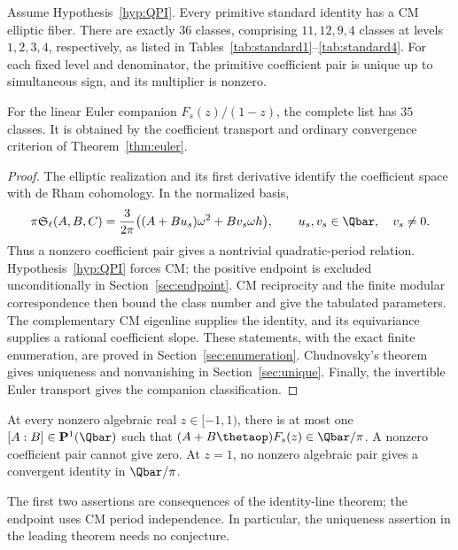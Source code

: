 \begin{theorem}\label{thm:main-conditional}
Assume Hypothesis~\ref{hyp:QPI}. Every primitive standard identity has
a CM elliptic fiber. There are exactly $36$ classes, comprising
$11,12,9,4$ classes at levels $1,2,3,4$, respectively, as listed in
Tables~\ref{tab:standard1}--\ref{tab:standard4}.
For each fixed level and denominator, the primitive coefficient pair
is unique up to simultaneous sign, and its multiplier is nonzero.

For the linear Euler companion $F_s(z)/(1-z)$, the complete list has
$35$ classes. It is obtained by the coefficient transport and ordinary
convergence criterion of Theorem~\ref{thm:euler}.
\end{theorem}
\begin{proof}
The elliptic realization and its first derivative identify the
coefficient space with de Rham cohomology. In the normalized basis,
\begin{equation}\label{rev:eq:leading-reduction}
 \pi\mathfrak S_\ell(A,B,C)
  =\frac{3}{2\pi}\bigl((A+Bu_s)\omega^2+Bv_s\omega h\bigr),
 \qquad u_s,v_s\in\Qbar,\quad v_s\ne0.
\end{equation}
Thus a nonzero coefficient pair gives a nontrivial quadratic-period
relation. Hypothesis~\ref{hyp:QPI} forces CM; the positive endpoint is
excluded unconditionally in Section~\ref{sec:endpoint}. CM reciprocity
and the finite modular correspondence then bound the class number and
give the tabulated parameters. The complementary CM eigenline supplies
the identity, and its equivariance supplies a rational coefficient
slope. These statements, with the exact finite enumeration, are proved
in Section~\ref{sec:enumeration}. Chudnovsky's theorem gives uniqueness
and nonvanishing in Section~\ref{sec:unique}. Finally, the invertible
Euler transport gives the companion classification.
\end{proof}

\begin{theorem}\label{thm:unconditional}
At every nonzero algebraic real $z\in[-1,1)$, there is at most one
$[A:B]\in\mathbf P^1(\Qbar)$ such that
$(A+B\thetaop)F_s(z)\in\Qbar/\pi$. A nonzero coefficient pair cannot
give zero. At $z=1$, no nonzero algebraic pair gives a convergent
identity in $\Qbar/\pi$.
\end{theorem}

The first two assertions are consequences of the identity-line theorem;
the endpoint uses CM period independence. In particular, the uniqueness
assertion in the leading theorem needs no conjecture.

